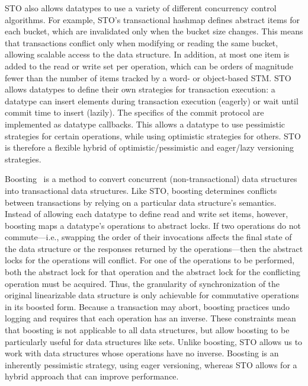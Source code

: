 STO also allows datatypes to use a variety of different concurrency control algorithms. For example, STO's transactional hashmap defines abstract items for each bucket, which are invalidated only when the bucket size changes. This means that transactions conflict only when modifying or reading the same bucket, allowing scalable access to the data structure. In addition, at most one item is added to the read or write set per operation, which can be orders of magnitude fewer than the number of items tracked by a word- or object-based STM. STO allows datatypes to define their own strategies for transaction execution: a datatype can insert elements during transaction execution (eagerly) or wait until commit time to insert (lazily). The specifics of the commit protocol are implemented as datatype callbacks. This allows a datatype to use pessimistic strategies for certain operations, while using optimistic strategies for others. STO is therefore a flexible hybrid of optimistic/pessimistic and eager/lazy versioning strategies.

Boosting~\cite{boost} is a method to convert concurrent (non-transactional) data structures into transactional data structures. Like STO, boosting determines conflicts between transactions by relying on a particular data structure's semantics. Instead of allowing each datatype to define read and write set items, however, boosting maps a datatype's operations to abstract locks. If two operations do not commute---i.e., swapping the order of their invocations affects the final state of the data structure or the responses returned by the operations---then the abstract locks for the operations will conflict. For one of the operations to be performed, both the abstract lock for that operation and the abstract lock for the conflicting operation must be acquired.
Thus, the granularity of synchronization of the original linearizable data structure is only achievable for commutative operations in its boosted form. Because a transaction may abort, boosting practices undo logging and requires that each operation has an inverse. These constraints mean that boosting is not applicable to all data structures, but allow boosting to be particularly useful for data structures like sets. Unlike boosting, STO allows us to work with data structures whose operations have no inverse. Boosting is an inherently pessimistic strategy, using eager versioning, whereas STO allows for a hybrid approach that can improve performance.

